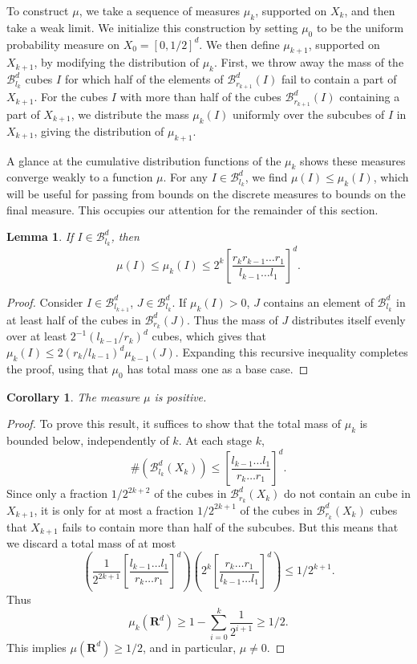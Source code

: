 \documentclass[usenames,dvipsnames]{article}
\theoremstyle{plain}
\newtheorem{lemma}{Lemma}
\newtheorem{corollary}{Corollary}
\theoremstyle{plain}
\begin{document}
To construct $\mu$, we take a sequence of measures $\mu_k$, supported on $X_k$, and then take a weak limit. We initialize this construction by setting $\mu_0$ to be the uniform probability measure on $X_0 = [0,1/2]^d$. We then define $\mu_{k+1}$, supported on $X_{k+1}$, by modifying the distribution of $\mu_k$. First, we throw away the mass of the $\mathcal{B}^d_{l_k}$ cubes $I$ for which half of the elements of $\mathcal{B}^d_{r_{k+1}}(I)$ fail to contain a part of $X_{k+1}$. For the cubes $I$ with more than half of the cubes $\mathcal{B}^d_{r_{k+1}}(I)$ containing a part of $X_{k+1}$, we distribute the mass $\mu_k(I)$ uniformly over the subcubes of $I$ in $X_{k+1}$, giving the distribution of $\mu_{k+1}$.

A glance at the cumulative distribution functions of the $\mu_k$ shows these measures converge weakly to a function $\mu$. For any $I \in \mathcal{B}^d_{l_k}$, we find $\mu(I) \leq \mu_k(I)$, which will be useful for passing from bounds on the discrete measures to bounds on the final measure. This occupies our attention for the remainder of this section.

\begin{lemma}
	If $I \in \mathcal{B}^d_{l_k}$, then
	\[ \mu(I) \leq \mu_k(I) \leq 2^k \left[ \frac{r_k r_{k-1} \dots r_1}{l_{k-1} \dots l_1} \right]^d. \]
\end{lemma}
\begin{proof}
	Consider $I \in \mathcal{B}^d_{l_{k+1}}$, $J \in \mathcal{B}^d_{l_k}$. If $\mu_k(I) > 0$, $J$ contains an element of $\mathcal{B}^d_{l_k}$ in at least half of the cubes in $\mathcal{B}^d_{r_k}(J)$. Thus the mass of $J$ distributes itself evenly over at least $2^{-1} (l_{k-1}/r_k)^d$ cubes, which gives that $\mu_k(I) \leq 2(r_k/l_{k-1})^d \mu_{k-1}(J)$. Expanding this recursive inequality completes the proof, using that $\mu_0$ has total mass one as a base case.
\end{proof}

\begin{corollary}
	The measure $\mu$ is positive.
\end{corollary}
\begin{proof}
	To prove this result, it suffices to show that the total mass of $\mu_k$ is bounded below, independently of $k$. At each stage $k$,
	\[ \# (\mathcal{B}^d_{l_k}(X_k)) \leq \left[ \frac{l_{k-1} \dots l_1}{r_k \dots r_1} \right]^d. \]
	Since only a fraction $1/2^{2k+2}$ of the cubes in $\mathcal{B}^d_{r_k}(X_k)$ do not contain an cube in $X_{k+1}$, it is only for at most a fraction $1/2^{2k+1}$ of the cubes in $\mathcal{B}^d_{r_k}(X_k)$ cubes that $X_{k+1}$ fails to contain more than half of the subcubes. But this means that we discard a total mass of at most
	\[ \left( \frac{1}{2^{2k + 1}} \left[ \frac{l_{k-1} \dots l_1}{r_k \dots r_1} \right]^d \right) \left( 2^{k} \left[ \frac{r_k \dots r_1}{l_{k-1} \dots l_1} \right]^d \right) \leq 1/2^{k+1}. \]
	Thus
	\[ \mu_k(\mathbf{R}^d) \geq 1 - \sum_{i = 0}^k \frac{1}{2^{i+1}} \geq 1/2. \]
	This implies $\mu(\mathbf{R}^d) \geq 1/2$, and in particular, $\mu \neq 0$.
\end{proof}
\end{document}
